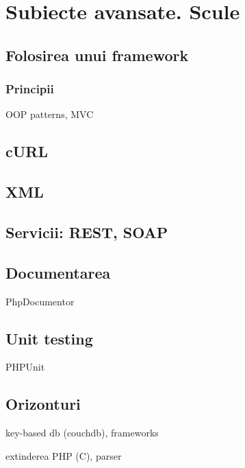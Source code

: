 \chapter{Subiecte avansate. Scule}
\section{Folosirea unui framework}
\subsection{Principii}
OOP patterns, MVC
\section{cURL}
\section{XML}
\section{Servicii: REST, SOAP}
\section{Documentarea}
PhpDocumentor

\section{Unit testing}
PHPUnit
\section{Orizonturi}
key-based db (couchdb), frameworks

extinderea PHP (C), parser